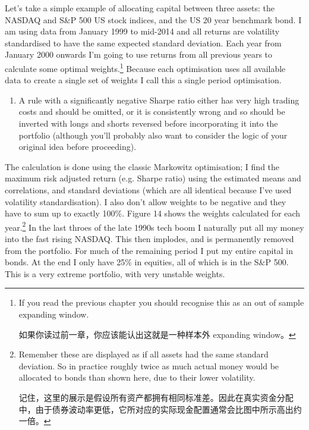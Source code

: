 
Let's take a simple example of allocating capital between three assets: the NASDAQ and S\&P 500 US stock indices, and the US 20 year benchmark bond. I am using data from January 1999 to mid-2014 and all returns are volatility standardised to have the same expected standard deviation. Each year from January 2000 onwards I'm going to use returns from all previous years to calculate some optimal weights.\footnote{If you read the previous chapter you should recognise this as an out of sample expanding window. \par 如果你读过前一章，你应该能认出这就是一种样本外 expanding window。} Because each optimisation uses all available data to create a single set of weights I call this a single period optimisation. \begin{enumerate}
\item A rule with a significantly negative Sharpe ratio either has very high trading costs and should be omitted, or it is consistently wrong and so should be inverted with longs and shorts reversed before incorporating it into the portfolio (although you'll probably also want to consider the logic of your original idea before proceeding). \end{enumerate}
The calculation is done using the classic Markowitz optimisation; I find the maximum risk adjusted return (e.g. Sharpe ratio) using the estimated means and correlations, and standard deviations (which are all identical because I've used volatility standardisation). I also don't allow weights to be negative and they have to sum up to exactly 100\%. Figure 14 shows the weights calculated for each year.\footnote{Remember these are displayed as if all assets had the same standard deviation. So in practice roughly twice as much actual money would be allocated to bonds than shown here, due to their lower volatility. \par 记住，这里的展示是假设所有资产都拥有相同标准差。因此在真实资金分配中，由于债券波动率更低，它所对应的实际现金配置通常会比图中所示高出约一倍。} In the last throes of the late 1990s tech boom I naturally put all my money into the fast rising NASDAQ. This then implodes, and is permanently removed from the portfolio. For much of the remaining period I put my entire capital in bonds. At the end I only have 25\% in equities, all of which is in the S\&P 500. This is a very extreme portfolio, with very unstable weights.

